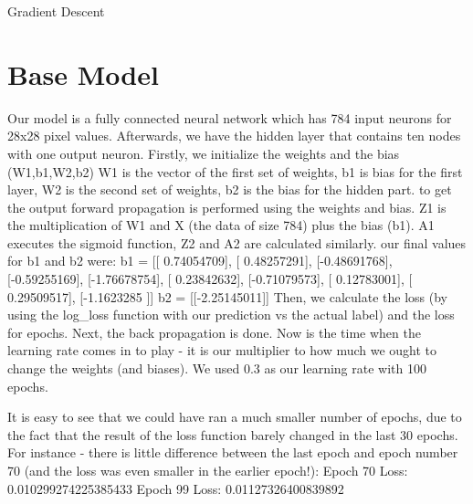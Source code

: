 \documentclass{article}
\begin{document}
\begin{algorithm}
\caption{Gradient Descent}\label{alg:cap}
\begin{algorithmic}

 

    \State{} 
      

\EndWhile
\end{algorithmic}
\end{algorithm}


\section{Base Model}
Our model is a fully connected neural network which has 784 input neurons for 28x28 pixel values.
Afterwards, we have the hidden layer that contains ten nodes with one output neuron. 
Firstly, we initialize the weights and the bias (W1,b1,W2,b2) W1 is the vector of the first set of weights, b1 is bias for the first layer, W2 is the second set of weights, b2 is the  bias for the hidden part.
\newline
to get the output forward propagation is performed using the weights and bias.
Z1 is the multiplication of W1 and X (the data of size 784) plus the bias (b1). A1 executes the sigmoid function, Z2 and A2 are calculated similarly.
\newline
our final values for b1 and b2 were:
\newline
b1 = [[ 0.74054709], [ 0.48257291], [-0.48691768], [-0.59255169], [-1.76678754], [ 0.23842632], [-0.71079573], [ 0.12783001], [ 0.29509517], [-1.1623285 ]]
\newline
b2 = [[-2.25145011]]
\newline
Then, we calculate the loss (by using the log\_loss function with our prediction vs the actual label) and the loss for epochs.
Next, the back propagation is done. Now is the time when the learning rate comes in to play - it is our multiplier to how much we ought to change the weights (and biases).
\newline
We used 0.3 as our learning rate with 100 epochs.

It is easy to see that we could have ran a much smaller number of epochs, due to the fact that the result of the loss function barely changed in the last 30 epochs.
\newline
For instance - there is little difference between the last epoch and epoch number 70 (and the loss was even smaller in the earlier epoch!):
\newline
Epoch 70  Loss: 0.010299274225385433
\newline
Epoch 99  Loss: 0.01127326400839892
\end{document}

